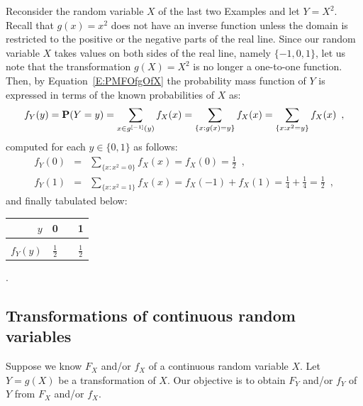 \begin{example}\label{Eg:DiscreteManyTo1TransYisXSquared}
Reconsider the random variable $X$ of the last two Examples and let $Y=X^2$.  
Recall that $g(x)=x^2$ does not have an inverse function unless the domain is restricted to the positive or the negative parts of the real line.  
Since our random variable $X$ takes values on both sides of the real line, namely $\{-1,0,1\}$, let us note that the transformation $g(X)=X^2$ is no longer a one-to-one function.  
Then, by Equation~\eqref{E:PMFOfgOfX} the probability mass function of $Y$ is expressed in terms of the known probabilities of $X$ as:\\ 
\[
f_Y(y)=\mathbf{P}(Y=y)= \sum_{x \in g^{[-1]}(y)} f_X(x)  = \sum_{\{x:g(x)=y\}} f_X(x) = \sum_{\{x:x^2=y\}} f_X(x) \enspace ,
\]
computed for each $y \in \{0,1\}$ as follows:
\begin{eqnarray*}
f_Y(0) &=& \sum_{\{x:x^2=0\}} f_X(x) = f_X(0)=\frac{1}{2} \enspace ,\\
f_Y(1) &=& \sum_{\{x:x^2=1\}} f_X(x) = f_X(-1)+f_X(1)=\frac{1}{4}+\frac{1}{4}=\frac{1}{2} \enspace ,
\end{eqnarray*}
and finally tabulated below:\\
\begin{center}
\begin{tabular}{r|ccc}
$y$ & 0 & & 1\\ \hline
 &  &  & \\ 
$f_Y(y)$ & $\frac{1}{2}$ & \quad & $\frac{1}{2}$
\end{tabular}\enspace .
\end{center}
\end{example}

\subsection{Transformations of continuous random variables}\label{S:TransformationsOFContinuousRvs}
Suppose we know $F_X$ and/or $f_X$ of a continuous random variable $X$.  
Let $Y=g(X)$ be a transformation of $X$.  
Our objective is to obtain $F_Y$ and/or $f_Y$ of $Y$ from $F_X$ and/or $f_X$.  

